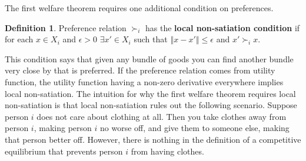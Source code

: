 \documentclass[12pt,reqno]{amsart}
\theoremstyle{definition}
\newtheorem{definition}{Definition}[section]
\newcommand{\norm}[1]{\left\Vert {#1} \right\Vert}
\newcommand{\pref}{\succ}
\begin{document}
The first welfare theorem requires one additional condition on
preferences.
\begin{definition}
  Preference relation $\pref_i$ has the \textbf{local non-satiation
    condition} if for each $x \in X_i$ and $\epsilon > 0$ $\exists x'
  \in X_i$ such that $\norm{x - x'} \leq \epsilon $ and $x' \pref_i x$.
\end{definition}
This condition says that given any bundle of goods you can find
another bundle very close by that is preferred. If the preference
relation comes from utility function, the utility function having a
non-zero derivative everywhere implies local non-satiation. The
intuition for why the first welfare theorem requires local
non-satiation is that local non-satiation rules out the following
scenario. Suppose person $i$ does not care about clothing at all. Then 
you take clothes away from person $i$, making person $i$ no worse off,
and give them to someone else, making that person better off. However,
there is nothing in the definition of a competitive equilibrium that
prevents person $i$ from having clothes.
\end{document}
